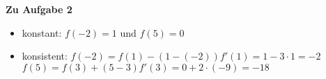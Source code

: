 \textbf{Zu Aufgabe 2}\\
\begin{itemize}
\item konstant: $f(-2)=1$ und $f(5)=0$
\item konsistent: $f(-2)=f(1)-(1-(-2))f'(1)=1-3\cdot 1=-2$ \\
\hspace*{16.0mm} $f(5)=f(3)+(5-3)f'(3)=0+2\cdot (-9)= -18$
\end{itemize}
%




